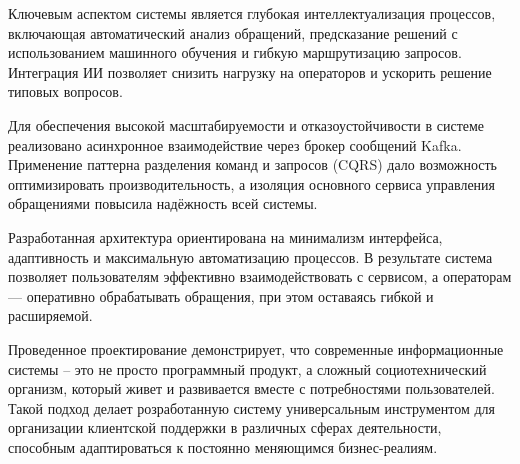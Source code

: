 Ключевым аспектом системы является глубокая интеллектуализация процессов, включающая автоматический анализ обращений, предсказание решений с использованием машинного обучения и гибкую маршрутизацию запросов. Интеграция ИИ позволяет снизить нагрузку на операторов и ускорить решение типовых вопросов.

Для обеспечения высокой масштабируемости и отказоустойчивости в системе реализовано асинхронное взаимодействие через брокер сообщений Kafka. Применение паттерна разделения команд и запросов (CQRS) дало возможность оптимизировать производительность, а изоляция основного сервиса управления обращениями повысила надёжность всей системы.

Разработанная архитектура ориентирована на минимализм интерфейса, адаптивность и максимальную автоматизацию процессов. В результате система позволяет пользователям эффективно взаимодействовать с сервисом, а операторам — оперативно обрабатывать обращения, при этом оставаясь гибкой и расширяемой.

Проведенное проектирование демонстрирует, что современные информационные системы – это не просто программный продукт, а сложный социотехнический организм, который живет и развивается вместе с потребностями пользователей. Такой подход делает розработанную систему универсальным инструментом для организации клиентской поддержки в различных сферах деятельности, способным адаптироваться к постоянно меняющимся бизнес-реалиям.
